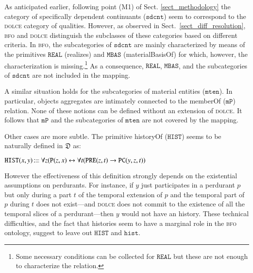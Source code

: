 \documentclass[ao]{iosart2x}
\newcommand{\bflist}{\begin{list}{}{\setlength{\topsep}{2mm}\setlength{\parsep}{0mm}\setlength{\leftmargin}{9.2mm}\setlength{\labelwidth}{8mm}}}
\newcommand{\eflist}{\end{list}}
\newcommand{\pr}[1]{\mathtt{#1}}
\newcommand{\cn}[1]{\mathtt{#1}}
\newcommand{\ifif}{\leftrightarrow}
\newcommand\textequal{%
 \rule[.08ex]{5pt}{0.35pt}\llap{\rule[.78ex]{5pt}{0.35pt}}}
\newcommand{\sdef}{{\hspace{1.5pt}:\hspace{-2.5pt}\textequal\hspace{3pt}}}
\newcommand{\dolce}{{\textsc{dolce}}}
\newcommand{\bfo}{{\textsc{bfo}}}
\newcommand {\thdolce} {\ensuremath{\mathfrak{D}}}
\newcommand {\Pd} {\ensuremath{\pr{P}}}
\newcommand {\PREd} {\ensuremath{\pr{PRE}}}
\newcommand {\PCd} {\ensuremath{\pr{PC}}}
\newcommand{\sdcntbcat}{\cn{sdcnt}}
\newcommand{\mtenbcat}{\cn{mten}}
\newcommand{\histbcat}{\cn{hist}}
\newcommand{\bfompart}{\pr{mP}}
\newcommand{\bforealizes}{\pr{REAL}}
\newcommand{\bfohistory}{\pr{HIST}}
\begin{document}
As anticipated earlier, following point (M1) of Sect. \ref{sect_methodology} the category of specifically dependent continuants ($\sdcntbcat$) seem to correspond to the {\dolce} category of qualities. However, as observed in Sect.~\ref{sect_diff_resolution}, {\bfo} and {\dolce} distinguish the subclasses of these categories based on different criteria. In {\bfo}, the subcategories of $\sdcntbcat$ are mainly characterized by means of the primitives $\bforealizes$ (realizes) and $\pr{MBAS}$ (materialBasisOf) for which, however, the characterization is missing.\footnote{Some necessary conditions can be collected for $\bforealizes$ but these are not enough to characterize the relation.} As a consequence, $\bforealizes$, $\pr{MBAS}$, and the subcategories of $\sdcntbcat$ are not included in the mapping.

A similar situation holds for the subcategories of material entities ($\mtenbcat$). In particular, objects aggregates are intimately connected to the memberOf ($\bfompart$) relation. None of these notions can be defined without an extension of {\dolce}. It follows that $\bfompart$ and the subcategories of $\mtenbcat$ are not covered by the mapping.

Other cases are more subtle. The primitive historyOf ($\bfohistory$) seems to be naturally defined in $\thdolce$ as:
%
\bflist
\item[] $\bfohistory(x,y) \sdef \forall z(\Pd(z,x) \ifif \forall t(\PREd(z,t) \to \PCd(y,z,t))$
\eflist
%
However the effectiveness of this definition strongly depends on the existential assumptions on perdurants. For instance, if $y$ just participates in a perdurant $p$ but only during a part $t$ of the temporal  extension of $p$ and the temporal part of $p$ during $t$ does not exist---and {\dolce} does not commit to the existence of all the temporal slices of a perdurant---then $y$ would not have an history. These technical difficulties, and the fact that histories seem to have a marginal role in the {\bfo} ontology, suggest to leave out $\bfohistory$ and $\histbcat$.
\end{document}
